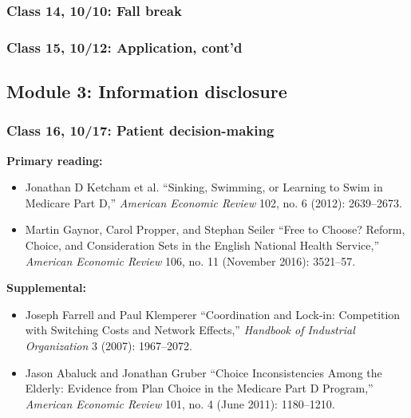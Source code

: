 \documentclass[11pt,]{article}
\providecommand{\tightlist}{%
  \setlength{\itemsep}{0pt}\setlength{\parskip}{0pt}}
\begin{document}
\hypertarget{class-14-1010-fall-break}{%
\subsubsection{Class 14, 10/10: Fall
break}\label{class-14-1010-fall-break}}

\hypertarget{class-15-1012-application-contd}{%
\subsubsection{Class 15, 10/12: Application,
cont'd}\label{class-15-1012-application-contd}}

\hypertarget{module-3-information-disclosure}{%
\subsection{Module 3: Information
disclosure}\label{module-3-information-disclosure}}

\hypertarget{class-16-1017-patient-decision-making}{%
\subsubsection{Class 16, 10/17: Patient
decision-making}\label{class-16-1017-patient-decision-making}}

\textbf{Primary reading:}

\begin{itemize}
\tightlist
\item
  Jonathan D Ketcham et al. {``Sinking, Swimming, or Learning to Swim in
  {Medicare} {Part} {D},''} \emph{American Economic Review} 102, no. 6
  (2012): 2639--2673.
\item
  Martin Gaynor, Carol Propper, and Stephan Seiler {``Free to {Choose}?
  {Reform}, {Choice}, and {Consideration} {Sets} in the {English}
  {National} {Health} {Service},''} \emph{American Economic Review} 106,
  no. 11 (November 2016): 3521--57.
\end{itemize}

\textbf{Supplemental:}

\begin{itemize}
\tightlist
\item
  Joseph Farrell and Paul Klemperer {``Coordination and Lock-in:
  {Competition} with Switching Costs and Network Effects,''}
  \emph{Handbook of Industrial Organization} 3 (2007): 1967--2072.
\item
  Jason Abaluck and Jonathan Gruber {``Choice {Inconsistencies} Among
  the {Elderly}: {Evidence} from {Plan} {Choice} in the {Medicare}
  {Part} {D} {Program},''} \emph{American Economic Review} 101, no. 4
  (June 2011): 1180--1210.
\end{itemize}
\end{document}
